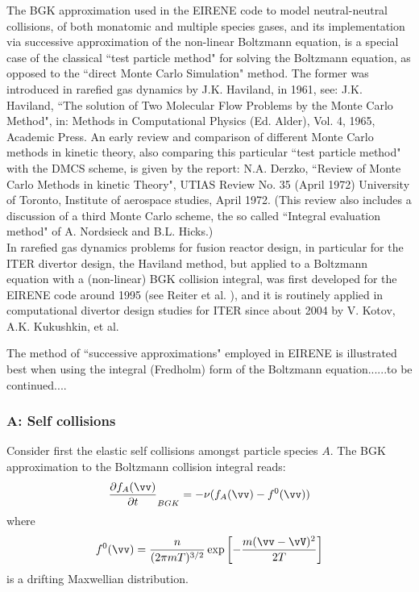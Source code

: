 The BGK approximation used in the EIRENE code to model neutral-neutral collisions,
of both monatomic and multiple species gases,
and its implementation via successive approximation of the non-linear Boltzmann equation,
is a special case of the classical
``test particle method" for solving the Boltzmann equation, as opposed to the ``direct Monte Carlo
Simulation" method. The former was introduced in rarefied gas dynamics by J.K. Haviland, in 1961, see:
J.K. Haviland, ``The solution of Two Molecular Flow Problems by the Monte Carlo Method",
in: Methods in Computational Physics (Ed. Alder), Vol. 4, 1965, Academic Press.
An early review and comparison of different Monte Carlo methods in kinetic theory, also comparing this particular
``test particle method" with the DMCS scheme, is given by
the report: N.A. Derzko, ``Review of Monte Carlo Methods in kinetic Theory", UTIAS Review No. 35 (April 1972)
University of Toronto, Institute of aerospace studies, April 1972.
(This review also includes a discussion of a third Monte Carlo scheme, the so called ``Integral evaluation method" of
A. Nordsieck and B.L. Hicks.)
\\
In rarefied gas dynamics problems for fusion reactor design, in particular for the ITER divertor design, the Haviland method,
but applied to a Boltzmann equation with a (non-linear) BGK collision integral,
was first developed for the EIRENE code around 1995 (see Reiter et al. \cite{kn:Reiter96}),
and it is routinely applied in computational divertor design studies for ITER since
about 2004 by V. Kotov, A.K. Kukushkin, et al.

The method of ``successive approximations" employed in EIRENE is illustrated best when using the integral (Fredholm) form
of the Boltzmann equation......to be continued....


\subsubsection{A: Self collisions}


Consider first the elastic self collisions amongst particle species $A$.
The BGK approximation to the Boltzmann collision integral reads:
\begin{equation}
\frac{\partial f_A(\vv)}{\partial t}_{BGK}=-\nu (f_A(\vv)-f^0(\vv))
\end{equation}
where
\begin{equation}
f^0(\vv)=\frac{n}{(2\pi mT)^{3/2}} \exp\left[-\frac{m(\vv-\vV)^2}{2T}\right]
\end{equation}
is a drifting Maxwellian distribution.

